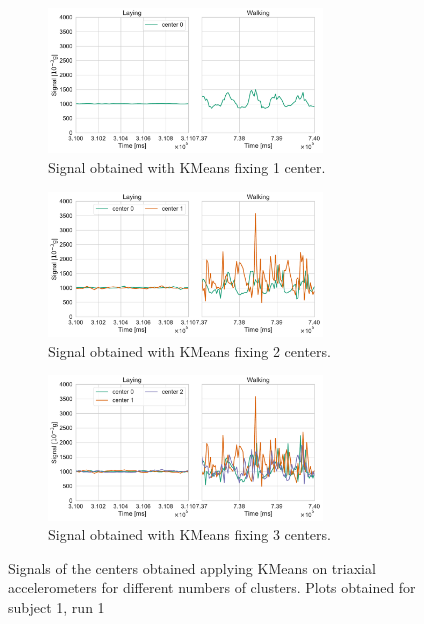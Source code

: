 \documentclass[10pt, a4paper, twocolumn]{article}
\theoremstyle{definition}
\begin{document}
\begin{figure} \centering
\begin{subfigure}{\textwidth}\centering
         \includegraphics[width=0.8\textwidth]{../clustering/clustering_results_euclidean/subject_1/run_1/triaxial_acc_1_centers.pdf}
         \caption{Signal obtained with KMeans fixing 1 center.}\label{fig:triax1}
     \end{subfigure}
     
\begin{subfigure}{\textwidth}\centering
         \includegraphics[width=0.8\textwidth]{../clustering/clustering_results_euclidean/subject_1/run_1/triaxial_acc_2_centers.pdf}
         \caption{Signal obtained with KMeans fixing 2 centers.}\label{fig:triax2}
     \end{subfigure}
     
\begin{subfigure}{\textwidth}\centering
         \includegraphics[width=0.8\textwidth]{../clustering/clustering_results_euclidean/subject_1/run_1/triaxial_acc_3_centers.pdf}
         \caption{Signal obtained with KMeans fixing 3 centers.}\label{fig:triax3}
     \end{subfigure}
     
  \caption{Signals of the centers obtained applying KMeans on triaxial accelerometers for different numbers of clusters. Plots obtained for subject 1, run 1}\label{fig:triax}
\end{figure}
\end{document}
